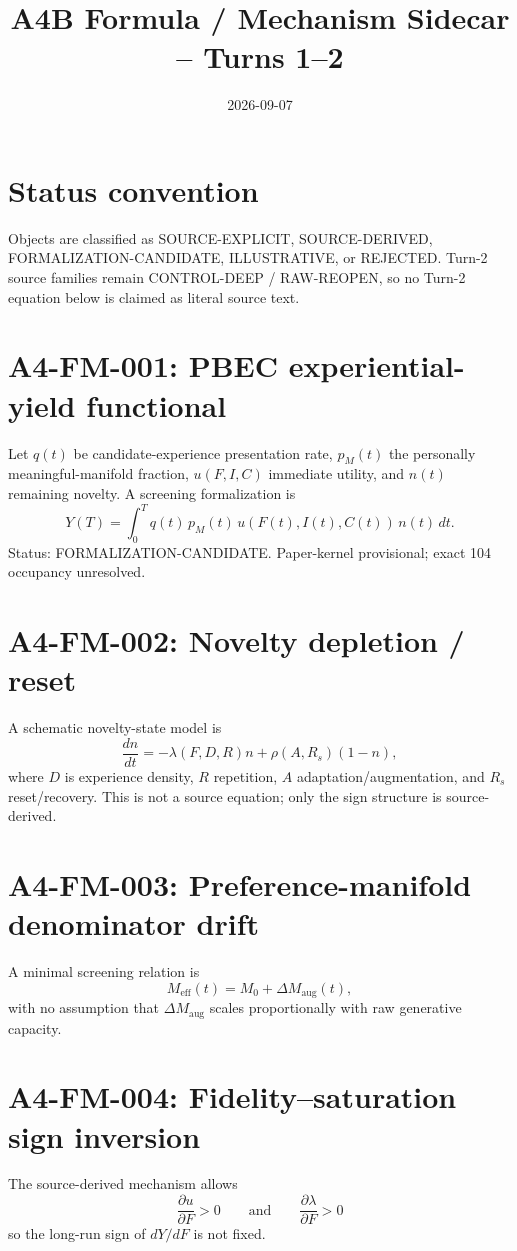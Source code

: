 \documentclass[11pt]{article}
\title{A4B Formula / Mechanism Sidecar -- Turns 1--2}
\date{2026-09-07}
\begin{document}
\maketitle

\section*{Status convention}
Objects are classified as SOURCE-EXPLICIT, SOURCE-DERIVED, FORMALIZATION-CANDIDATE, ILLUSTRATIVE, or REJECTED. Turn-2 source families remain CONTROL-DEEP / RAW-REOPEN, so no Turn-2 equation below is claimed as literal source text.

\section*{A4-FM-001: PBEC experiential-yield functional}
Let $q(t)$ be candidate-experience presentation rate, $p_M(t)$ the personally meaningful-manifold fraction, $u(F,I,C)$ immediate utility, and $n(t)$ remaining novelty. A screening formalization is
\[
Y(T)=\int_0^T q(t)\,p_M(t)\,u(F(t),I(t),C(t))\,n(t)\,dt.
\]
Status: FORMALIZATION-CANDIDATE. Paper-kernel provisional; exact 104 occupancy unresolved.

\section*{A4-FM-002: Novelty depletion / reset}
A schematic novelty-state model is
\[
\frac{dn}{dt}=-\lambda(F,D,R)n+\rho(A,R_s)(1-n),
\]
where $D$ is experience density, $R$ repetition, $A$ adaptation/augmentation, and $R_s$ reset/recovery. This is not a source equation; only the sign structure is source-derived.

\section*{A4-FM-003: Preference-manifold denominator drift}
A minimal screening relation is
\[
M_{\mathrm{eff}}(t)=M_0+\Delta M_{\mathrm{aug}}(t),
\]
with no assumption that $\Delta M_{\mathrm{aug}}$ scales proportionally with raw generative capacity.

\section*{A4-FM-004: Fidelity--saturation sign inversion}
The source-derived mechanism allows
\[
\frac{\partial u}{\partial F}>0
\qquad\text{and}\qquad
\frac{\partial \lambda}{\partial F}>0
\]
so the long-run sign of $dY/dF$ is not fixed.
\end{document}
